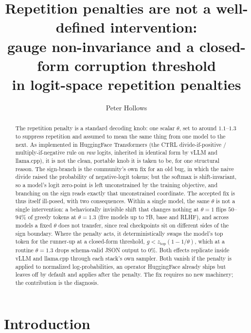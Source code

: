 \documentclass[11pt]{article}
\title{\bf Repetition penalties are not a well-defined intervention:\\
gauge non-invariance and a closed-form corruption threshold\\
in logit-space repetition penalties}
\author{Peter Hollows}
\date{}
\newcommand{\ztop}{z_{\mathrm{top}}}
\newcommand{\thp}{\theta}
\begin{document}
\maketitle

\begin{abstract}
The repetition penalty is a standard decoding knob: one scalar $\thp$, set to around $1.1$--$1.3$
to suppress repetition and assumed to mean the same thing from one model to the next. As
implemented in HuggingFace Transformers (the CTRL divide-if-positive / multiply-if-negative rule
on \emph{raw} logits, inherited in identical form by vLLM and llama.cpp), it is not the clean,
portable knob it is taken to be, for one structural reason. The sign-branch is the community's
own fix for an old bug, in which the naive divide raised the probability of negative-logit
tokens; but the softmax is shift-invariant, so a model's logit zero-point is left unconstrained
by the training objective, and branching on the sign reads exactly that unconstrained
coordinate. The accepted
fix is thus itself ill-posed, with two consequences. Within a single model, the same $\thp$ is
not a single intervention: a behaviorally invisible shift that changes nothing at $\thp=1$ flips
$50$--$94\%$ of greedy tokens at $\thp=1.3$ (five models up to 7B, base and RLHF), and across
models a fixed $\thp$ does not transfer, since real checkpoints sit on different sides of the
sign boundary. Where the penalty acts, it deterministically swaps the model's top token for the
runner-up at a closed-form threshold, $g < \ztop(1-1/\thp)$, which at a routine $\thp=1.3$ drops
schema-valid JSON output to $0\%$. Both effects replicate inside vLLM and llama.cpp through
each stack's own sampler. Both vanish if the penalty is applied to
normalized log-probabilities, an operator HuggingFace already ships but leaves off by default
and applies after the penalty. The fix requires no new machinery; the contribution is the
diagnosis.
\end{abstract}

\section{Introduction}
\label{sec:intro}
\end{document}
